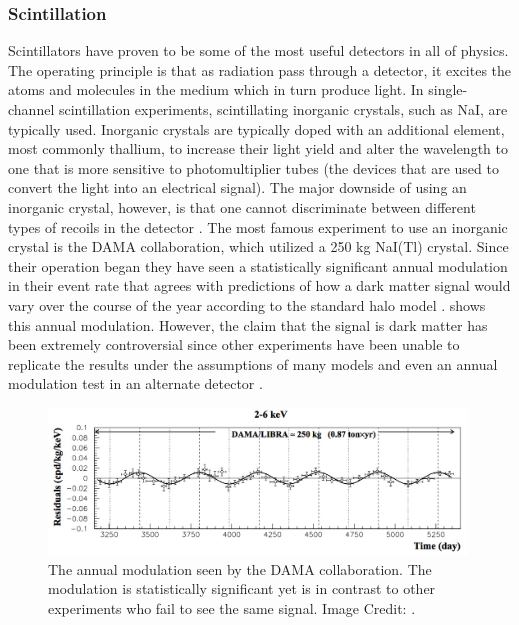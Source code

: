 \subsubsection{Scintillation}

Scintillators have proven to be some of the most useful detectors in all of physics.  The operating principle is that as radiation pass through a detector, it excites the atoms and molecules in the medium which in turn produce light.  In single-channel scintillation experiments, scintillating inorganic crystals, such as NaI, are typically used.  Inorganic crystals are typically doped with an additional element, most commonly thallium, to increase their light yield and alter the wavelength to one that is more sensitive to photomultiplier tubes (the devices that are used to convert the light into an electrical signal).  The major downside of using an inorganic crystal, however, is that one cannot discriminate between different types of recoils in the detector \cite{undagoitia2015dark}.  The most famous experiment to use an inorganic crystal is the DAMA collaboration, which utilized a 250 kg NaI(Tl) crystal.  Since their operation began they have seen a statistically significant annual modulation in their event rate that agrees with predictions of how a dark matter signal would vary over the course of the year according to the standard halo model \cite{bernabei2010particle}.    shows this annual modulation.  However, the claim that the signal is dark matter has been extremely controversial since other experiments have been unable to replicate the results under the assumptions of many models and even an annual modulation test in an alternate detector \cite{aalseth2014maximum, xmass2016direct, aprile2017search}.

\begin{figure}[t]
	\centering
	\includegraphics[width=0.99\textwidth]{dama_modulation}
	\caption{The annual modulation seen by the DAMA collaboration.  The modulation is statistically significant yet is in contrast to other experiments who fail to see the same signal. Image Credit: \cite{undagoitia2015dark}.}
	\label{fig:dama_modulation}
\end{figure}

